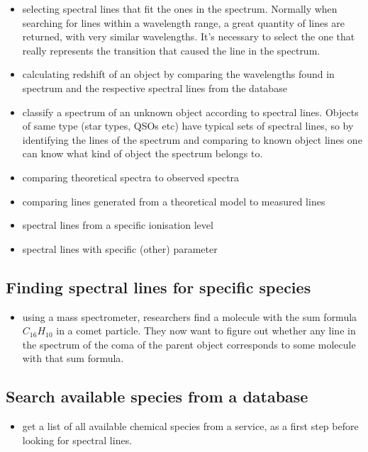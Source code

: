 \documentclass[11pt,a4paper]{ivoa}
\begin{document}
\begin{itemize}
\item selecting  spectral lines that fit the ones in the spectrum.
Normally when searching for lines within a wavelength range, a great
quantity of lines are returned, with very similar wavelengths. It's
necessary to select the one that really represents the transition that
caused the line in the spectrum.

\item calculating redshift of an object by comparing the wavelengths
found in spectrum and the respective spectral lines from the database

\item classify a spectrum of an unknown object according to spectral
lines. Objects of same type (star types, QSOs etc) have  typical sets of
spectral lines, so by identifying the lines of the spectrum and
comparing to known object lines one can know what kind of object the
spectrum belongs to.

\item comparing theoretical spectra to observed spectra
\item comparing  lines generated from a theoretical model to measured lines
\item spectral lines from a specific ionisation level
\item spectral lines with specific (other) parameter
\end{itemize}

\subsection{Finding spectral lines for specific species}
\begin{itemize}
\item using a mass spectrometer, researchers find a molecule with the
sum formula $C_{16}H_{10}$  in a comet particle.  They now want to
figure out whether any line in the spectrum of the coma of the parent
object corresponds to some molecule with that sum formula.
\end{itemize}

\subsection{Search available species from a database}

\begin{itemize}
\item get a list of all available chemical species from a service, as a
first step before looking for spectral lines.
\end{itemize}
\end{document}
